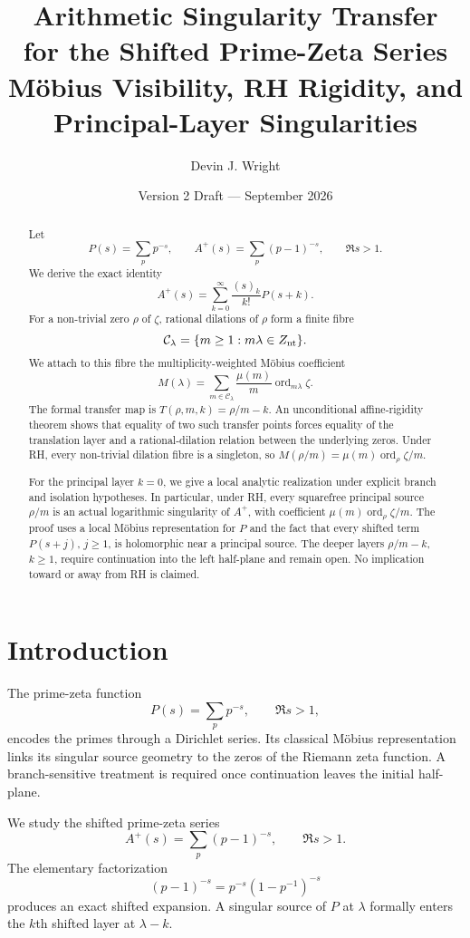 \documentclass[11pt,a4paper]{article}
\title{\textbf{Arithmetic Singularity Transfer\\for the Shifted Prime-Zeta Series}\\[3pt]
\large Möbius Visibility, RH Rigidity, and Principal-Layer Singularities}
\author{Devin J. Wright}
\date{Version 2 Draft --- September 2026}
\theoremstyle{remark}
\newcommand{\ord}{\operatorname{ord}}
\begin{document}
\maketitle

\begin{abstract}
Let
\[
P(s)=\sum_p p^{-s},\qquad A^+(s)=\sum_p(p-1)^{-s},\qquad \Re s>1.
\]
We derive the exact identity
\[
A^+(s)=\sum_{k=0}^{\infty}\frac{(s)_k}{k!}P(s+k).
\]
For a non-trivial zero $\rho$ of $\zeta$, rational dilations of $\rho$ form a finite fibre
\[
\mathcal C_\lambda=\{m\ge1:m\lambda\in Z_{\rm nt}\}.
\]
We attach to this fibre the multiplicity-weighted Möbius coefficient
\[
M(\lambda)=\sum_{m\in\mathcal C_\lambda}\frac{\mu(m)}m\ord_{m\lambda}\zeta.
\]
The formal transfer map is $T(\rho,m,k)=\rho/m-k$. An unconditional affine-rigidity theorem shows that equality of two such transfer points forces equality of the translation layer and a rational-dilation relation between the underlying zeros. Under RH, every non-trivial dilation fibre is a singleton, so $M(\rho/m)=\mu(m)\ord_\rho\zeta/m$.

For the principal layer $k=0$, we give a local analytic realization under explicit branch and isolation hypotheses. In particular, under RH, every squarefree principal source $\rho/m$ is an actual logarithmic singularity of $A^+$, with coefficient $\mu(m)\ord_\rho\zeta/m$. The proof uses a local Möbius representation for $P$ and the fact that every shifted term $P(s+j)$, $j\ge1$, is holomorphic near a principal source. The deeper layers $\rho/m-k$, $k\ge1$, require continuation into the left half-plane and remain open. No implication toward or away from RH is claimed.
\end{abstract}

\section{Introduction}

The prime-zeta function
\[
P(s)=\sum_p p^{-s},\qquad \Re s>1,
\]
encodes the primes through a Dirichlet series. Its classical Möbius representation links its singular source geometry to the zeros of the Riemann zeta function. A branch-sensitive treatment is required once continuation leaves the initial half-plane.

We study the shifted prime-zeta series
\[
A^+(s)=\sum_p(p-1)^{-s},\qquad \Re s>1.
\]
The elementary factorization
\[
(p-1)^{-s}=p^{-s}(1-p^{-1})^{-s}
\]
produces an exact shifted expansion. A singular source of $P$ at $\lambda$ formally enters the $k$th shifted layer at $\lambda-k$.
\end{document}
